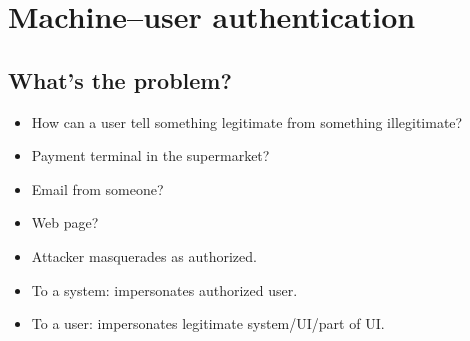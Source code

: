 \mode*




\section{Machine--user authentication}

\subsection{What's the problem?}

\begin{frame}
  \begin{question}
    \begin{itemize}
      \item How can a user tell something legitimate from something 
        illegitimate?
    \end{itemize}
  \end{question}

  \begin{example}
    \begin{itemize}
      \item Payment terminal in the supermarket?
      \item Email from someone?
      \item Web page?
    \end{itemize}
  \end{example}
\end{frame}

\begin{frame}
  \begin{definition}
    \begin{itemize}
      \item Attacker masquerades as authorized.
      \item To a system: impersonates authorized user.
      \item To a user: impersonates legitimate system/UI/part of UI.
    \end{itemize}
  \end{definition}
\end{frame}

